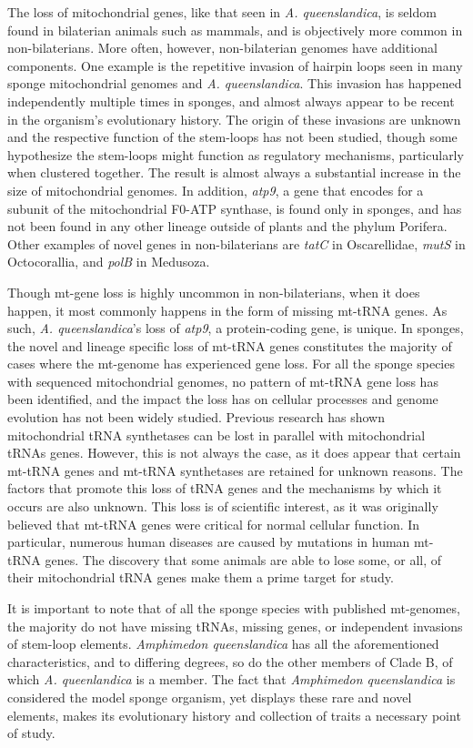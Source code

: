 \documentclass[../main.tex]{subfiles}
\begin{document}
The loss of mitochondrial genes, like that seen in \emph{A. queenslandica}, is seldom found in bilaterian animals such as mammals, and is objectively more common in non-bilaterians. More often, however, non-bilaterian genomes have additional components. One example is the repetitive invasion of hairpin loops seen in many sponge mitochondrial genomes and \emph{A. queenslandica}. This invasion has happened independently multiple times in sponges, and almost always appear to be recent in the organism's evolutionary history. The origin of these invasions are unknown and the respective function of the stem-loops has not been studied, though some hypothesize the stem-loops might function as regulatory mechanisms, particularly when clustered together. The result is almost always a substantial increase in the size of mitochondrial genomes. In addition, \emph{atp9}, a gene that encodes for a subunit of the mitochondrial F0-ATP synthase, is found only in sponges, and has not been found in any other lineage outside of plants and the phylum Porifera. Other examples of novel genes in non-bilaterians are \emph{tatC} in Oscarellidae, \emph{mutS} in Octocorallia, and \emph{polB} in Medusoza. 

Though mt-gene loss is highly uncommon in non-bilaterians, when it does happen, it most commonly happens in the form of missing mt-tRNA genes. As such, \emph{A. queenslandica}'s loss of \emph{atp9}, a protein-coding gene, is unique. In sponges, the novel and lineage specific loss of mt-tRNA genes constitutes the majority of cases where the mt-genome has experienced gene loss. For all the sponge species with sequenced mitochondrial genomes, no pattern of mt-tRNA gene loss has been identified, and the impact the loss has on cellular processes and genome evolution has not been widely studied. Previous research has shown mitochondrial tRNA synthetases can be lost in parallel with mitochondrial tRNAs genes. However, this is not always the case, as it does appear that certain mt-tRNA genes and mt-tRNA synthetases are retained for unknown reasons. The factors that promote this loss of tRNA genes and the mechanisms by which it occurs are also unknown. This loss is of scientific interest, as it was originally believed that mt-tRNA genes were critical for normal cellular function. In particular, numerous human diseases are caused by mutations in human mt-tRNA genes. The discovery that some animals are able to lose some, or all, of their mitochondrial tRNA genes make them a prime target for study.

It is important to note that of all the sponge species with published mt-genomes, the majority do not have missing tRNAs, missing genes, or independent invasions of stem-loop elements. \emph{Amphimedon queenslandica} has all the aforementioned characteristics, and to differing degrees, so do the other members of Clade B, of which \emph{A. queenlandica} is a member. The fact that \emph{Amphimedon queenslandica} is considered the model sponge organism, yet displays these rare and novel elements, makes its evolutionary history and collection of traits a necessary point of study.
\end{document}
